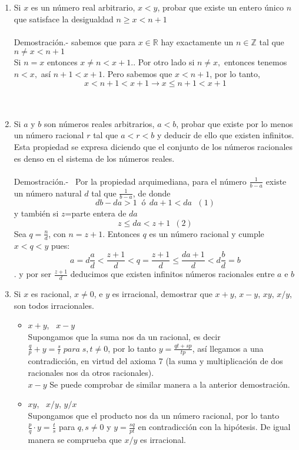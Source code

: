 \begin{enumerate}[\bfseries  1.]
\item Si $x$ es un número real arbitrario, $x<y$, probar que existe un entero único $n$ que satisface la desigualdad $n \geq x < n+1$\\\\
Demostración.- \; sabemos que para $x \in \mathbb{R}$ hay exactamente un $n \in \mathbb{Z}$ tal que $n \neq x < n+1$\\
Si $n=x$ entonces $x \neq n < x+1.$. Por otro lado si $n \neq x,$ entonces tenemos $n<x,$ así $n+1 < x+1$. Pero sabemos que $x<n+1$, por lo tanto, $$x<n+1<x+1 \rightarrow x \leq n+1 < x+1$$\\\\

\item Si $a$ y $b$ son números reales arbitrarios, $a<b$, probar que existe por lo menos un número racional $r$ tal que $a<r<b$ y deducir de ello que existen infinitos. Esta propiedad se expresa diciendo que el conjunto de los números racionales es denso en el sistema de los números reales.\\\\
Demostración.- \, Por la propiedad arquimediana, para el número $\displaystyle\frac{1}{b-a}$ existe un número natural $d$ tal que $\displaystyle\frac{1}{b-a}$, de donde 
$$db-da>1 \; \; ó \; \, da+1<da \; \, \, (1)$$
y también si $z$=parte entera de $da$
$$z\leq da < z+1 \, \, \, (2)$$
Sea $q=\displaystyle\frac{n}{d}$, con $n=z+1$. Entonces $q$ es un número racional y cumple $x<q<y$ pues:
$$a= d\displaystyle\frac{a}{d} < \frac{z+1}{d}<q=\frac{z+1}{d}\leq \frac{da+1}{d}<d\frac{b}{d}=b$$. y por ser $\displaystyle\frac{z+1}{d}$ deducimos que existen infinitos números racionales entre $a$ e $b$\\

\item Si $x$ es racional, $x\neq 0$, e $y$ es irracional, demostrar que $x+y$, $x-y$, $xy$, $x/y$, son todos irracionales.
\begin{itemize}
\item $x+y$, \, $x-y$\\
Supongamos que la suma nos da un racional, es decir $\displaystyle\frac{q}{p}+y=\frac{s}{t}\; para \; s,t\neq 0$, por lo tanto $y = \displaystyle\frac{qt+sp}{tp}$, así llegamos a una contradicción, en virtud del axioma 7 (la suma y multiplicación de dos racionales nos da otros racionales).\\
$x-y$ Se puede comprobar de similar manera a la anterior demostración.\\
\item $xy$, \, $x/y$, \; $y/x$\\
Supongamos que el producto nos da un número racional, por lo tanto $\frac{p}{q}\cdot y = \displaystyle\frac{t}{s}$ para $q,s \neq 0$ y $ \displaystyle y = \frac{sq}{pt}$ en contradicción con la hipótesis. De igual manera se comprueba que $x/y$ es irracional.\\\\
\end{itemize}


\end{enumerate}
